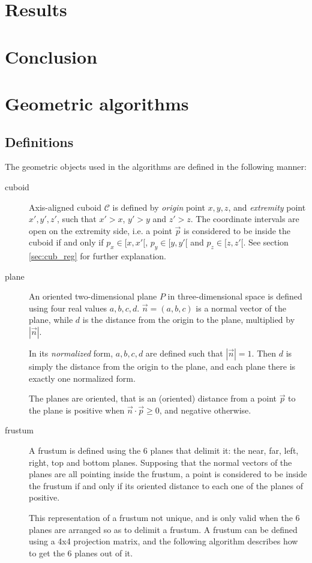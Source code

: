 \documentclass[a4paper,10pt,abstracton,notitlepage]{scrreprt}
\begin{document}
\chapter{Results}

\chapter{Conclusion}

\appendix
\chapter{Geometric algorithms}

\section{Definitions}
The geometric objects used in the algorithms are defined in the following manner:
\begin{description}
\item[cuboid] Axis-aligned cuboid $\mathcal{C}$ is defined by \emph{origin} point $x, y, z$, and \emph{extremity} point $x', y', z'$, such that $x' > x$, $y' > y$ and $z' > z$. The coordinate intervals are open on the extremity side, i.e. a point $\overrightarrow{p}$ is considered to be inside the cuboid if and only if $p_{x} \in [x, x'[$, $p_{y} \in [y, y'[$ and $p_{z} \in [z, z'[$. See section \ref{sec:cub_reg} for further explanation.

\item[plane] An oriented two-dimensional plane $P$ in three-dimensional space is defined using four real values $a, b, c, d$. $\overrightarrow{n} = (a, b, c)$ is a normal vector of the plane, while $d$ is the distance from the origin to the plane, multiplied by $|\overrightarrow{n}|$.

In its \emph{normalized} form, $a, b, c, d$ are defined such that $|\overrightarrow{n}| = 1$. Then $d$ is simply the distance from the origin to the plane, and each plane there is exactly one normalized form.

The planes are oriented, that is an (oriented) distance from a point $\overrightarrow{p}$ to the plane is positive when $\overrightarrow{n} \cdot \overrightarrow{p} \geq 0$, and negative otherwise.

\item[frustum] A frustum is defined using the 6 planes that delimit it: the near, far, left, right, top and bottom planes. Supposing that the normal vectors of the planes are all pointing inside the frustum, a point is considered to be inside the frustum if and only if its oriented distance to each one of the planes of positive.

This representation of a frustum not unique, and is only valid when the 6 planes are arranged so as to delimit a frustum. A frustum can be defined using a 4x4 projection matrix, and the following algorithm describes how to get the 6 planes out of it.
\end{description}
\end{document}
